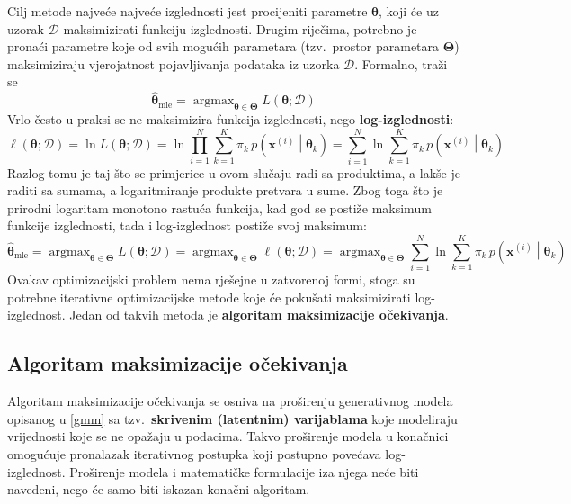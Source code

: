 \documentclass[times, utf8, zavrsni]{fer}
\DeclareMathOperator*{\argmax}{argmax}
\begin{document}
Cilj metode najveće najveće izglednosti jest procijeniti parametre $\boldsymbol{\theta}$, koji će uz uzorak $\mathcal{D}$ maksimizirati funkciju izglednosti. Drugim riječima, potrebno je pronaći parametre koje od svih mogućih parametara (tzv.\ prostor parametara $\boldsymbol{\Theta}$) maksimiziraju vjerojatnost pojavljivanja podataka iz uzorka $\mathcal{D}$. Formalno, traži se
\[\widehat{\boldsymbol{\theta}}_{\text{mle}} =
\argmax_{\boldsymbol{\theta} \in \boldsymbol{\Theta}}
L \left(\boldsymbol{\theta} ; \mathcal{D} \right)
\]
Vrlo često u praksi se ne maksimizira funkcija izglednosti, nego \textbf{log-izglednosti}:
\begin{equation}
\label{loglikelihood}
\ell \left(\boldsymbol{\theta} ; \mathcal{D} \right) 
= \ln {L \left(\boldsymbol{\theta} ; \mathcal{D} \right)}
= \ln{\prod_{i=1}^{N} 
\sum_{k=1}^{K} \pi_k \, p \left(\mathbf{x}^{(i)} \middle| \boldsymbol{\theta}_k\right)}
= \sum_{i=1}^{N} \ln{ 
\sum_{k=1}^{K} \pi_k \, p \left(\mathbf{x}^{(i)} \middle| \boldsymbol{\theta}_k\right)
}
\end{equation}
Razlog tomu je taj što se primjerice u ovom slučaju radi sa produktima, a lakše je raditi sa sumama, a logaritmiranje produkte pretvara u sume. Zbog toga što je prirodni logaritam monotono rastuća funkcija, kad god se postiže maksimum funkcije izglednosti, tada i log-izglednost postiže svoj maksimum:
\[\widehat{\boldsymbol{\theta}}_{\text{mle}} =
\argmax_{\boldsymbol{\theta} \in \boldsymbol{\Theta}}
L \left(\boldsymbol{\theta} ; \mathcal{D} \right)
= \argmax_{\boldsymbol{\theta} \in \boldsymbol{\Theta}}
\ell \left(\boldsymbol{\theta} ; \mathcal{D} \right)
= \argmax_{\boldsymbol{\theta} \in \boldsymbol{\Theta}}
\sum_{i=1}^{N} \ln{ 
\sum_{k=1}^{K} \pi_k \, p \left(\mathbf{x}^{(i)} \middle| \boldsymbol{\theta}_k\right)
}
\]
Ovakav optimizacijski problem nema rješejne u zatvorenoj formi, stoga su potrebne iterativne optimizacijske metode koje će pokušati maksimizirati log-izglednost. Jedan od takvih metoda je \textbf{algoritam maksimizacije očekivanja}.

\subsection{Algoritam maksimizacije očekivanja}
Algoritam maksimizacije očekivanja  se osniva na proširenju generativnog modela opisanog u \ref{gmm} sa tzv.\ \textbf{skrivenim (latentnim) varijablama} koje modeliraju vrijednosti koje se ne opažaju u podacima. Takvo proširenje modela u konačnici omogućuje pronalazak iterativnog postupka koji postupno povećava log-izglednost. Proširenje modela i matematičke formulacije iza njega neće biti navedeni, nego će samo biti iskazan konačni algoritam.
\end{document}
